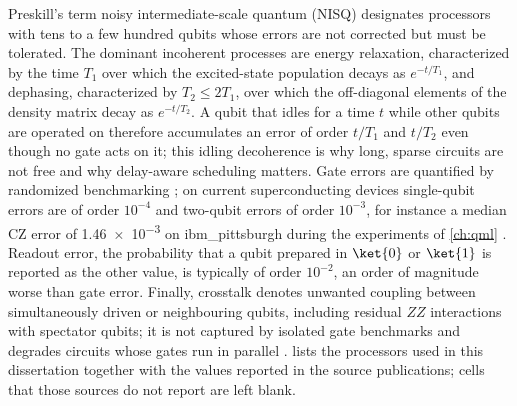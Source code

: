 Preskill's term noisy intermediate-scale quantum (NISQ) \cite{preskill2018nisq} designates processors with tens to a few hundred qubits whose errors are not corrected but must be tolerated. The dominant incoherent processes are energy relaxation, characterized by the time $T_1$ over which the excited-state population decays as $e^{-t/T_1}$, and dephasing, characterized by $T_2\le 2T_1$, over which the off-diagonal elements of the density matrix decay as $e^{-t/T_2}$. A qubit that idles for a time $t$ while other qubits are operated on therefore accumulates an error of order $t/T_1$ and $t/T_2$ even though no gate acts on it; this idling decoherence is why long, sparse circuits are not free and why delay-aware scheduling matters. Gate errors are quantified by randomized benchmarking \cite{magesan2012rb}; on current superconducting devices single-qubit errors are of order $10^{-4}$ and two-qubit errors of order $10^{-3}$, for instance a median CZ error of \num{1.46e-3} on ibm\_pittsburgh during the experiments of \cref{ch:qml} \cite{guo2025shardq}. Readout error, the probability that a qubit prepared in $\ket{0}$ or $\ket{1}$ is reported as the other value, is typically of order $10^{-2}$, an order of magnitude worse than gate error. Finally, crosstalk denotes unwanted coupling between simultaneously driven or neighbouring qubits, including residual $ZZ$ interactions with spectator qubits; it is not captured by isolated gate benchmarks and degrades circuits whose gates run in parallel \cite{sheldon2016echoedcr}.  lists the processors used in this dissertation together with the values reported in the source publications; cells that those sources do not report are left blank.

